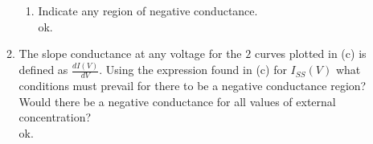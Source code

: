 \documentclass[11pt]{article}
\begin{document}
\begin{enumerate}[label=\arabic*.]
\begin{enumerate}[label=(\alph*)]
\begin{enumerate}[label=(\roman*)]
\item
Indicate any region of negative conductance.
\vspace*{1\baselineskip}
\\
ok.



\end{enumerate}





\item
The slope conductance at any voltage for the $2$ curves plotted in (c) is defined as $\frac{dI(V)} {dV}$. Using the expression found in (c) for $I_{SS}(V)$ what conditions must prevail for there to be a negative conductance region? Would there be a negative conductance for all values of external  concentration?
\vspace*{1\baselineskip}
\\
ok.
\end{enumerate}




\end{enumerate}
\end{document}
